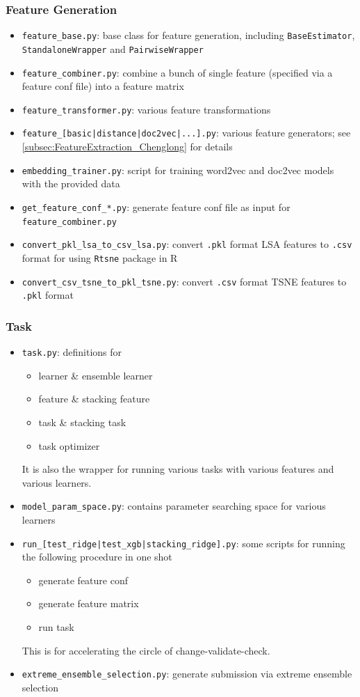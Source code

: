 \documentclass[12pt]{article}
\begin{document}
\subsubsection{Feature Generation}
\begin{itemize}
\item \texttt{feature\_base.py}: base class for feature generation, including \texttt{BaseEstimator}, \texttt{StandaloneWrapper} and \texttt{PairwiseWrapper}
\item \texttt{feature\_combiner.py}: combine a bunch of single feature (specified via a feature conf file) into a feature matrix
\item \texttt{feature\_transformer.py}: various feature transformations
\item \texttt{feature\_[basic|distance|doc2vec|...].py}: various feature generators; see \ref{subsec:FeatureExtraction_Chenglong} for details
\item \texttt{embedding\_trainer.py}: script for training word2vec and doc2vec models with the provided data
\item \texttt{get\_feature\_conf\_*.py}: generate feature conf file as input for \texttt{feature\_combiner.py}
\item \texttt{convert\_pkl\_lsa\_to\_csv\_lsa.py}: convert \texttt{.pkl} format LSA features to \texttt{.csv} format for using \texttt{Rtsne} package in R
\item \texttt{convert\_csv\_tsne\_to\_pkl\_tsne.py}: convert \texttt{.csv} format TSNE features to \texttt{.pkl} format
\end{itemize}
\subsubsection{Task}
\begin{itemize}
\item \texttt{task.py}: definitions for
\begin{itemize}
\item learner \& ensemble learner
\item feature \& stacking feature
\item task \& stacking task
\item task optimizer
\end{itemize}
It is also the wrapper for running various tasks with various features and various learners.
\item \texttt{model\_param\_space.py}: contains parameter searching space for various learners
\item \texttt{run\_[test\_ridge|test\_xgb|stacking\_ridge].py}: some scripts for running the following procedure in one shot
\begin{itemize}
\item generate feature conf
\item generate feature matrix
\item run task
\end{itemize}
This is for accelerating the circle of change-validate-check.
\item \texttt{extreme\_ensemble\_selection.py}: generate submission via extreme ensemble selection
\end{itemize}
\end{document}
